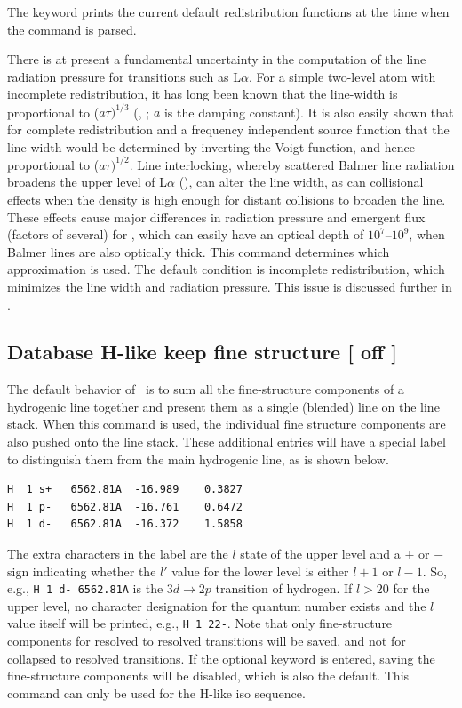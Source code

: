 The keyword  prints the current default
redistribution functions at the time when the command is parsed.

There is at present a fundamental uncertainty in the computation of the
line radiation pressure for transitions such as L$\alpha $.
For a simple two-level
atom with incomplete redistribution, it has long been known that the
line-width is proportional to ($a\tau)^{1/3}$
(\citealp{Adams1972}, \citealp{Harrington1973}; $a$ is
the damping constant).  It is also easily shown that for complete
redistribution and a frequency independent source function that the line
width would be determined by inverting the Voigt function, and hence
proportional to ($a\tau)^{1/2}$.
Line interlocking, whereby scattered Balmer line
radiation broadens the upper level of L$\alpha$
(\citealp{Hubbard1985}), can
alter the line width, as can collisional effects when the density is high
enough for distant collisions to broaden the line.
These effects cause
major differences in radiation pressure and emergent flux (factors of
several) for \la, which can easily have an optical depth of
$10^7$--$10^9$, when
Balmer lines are also optically thick.  
This command determines which
approximation is used.
The default condition is incomplete redistribution,
which minimizes the line width and radiation pressure.  This issue is
discussed further in \citet{Elitzur1986}.

\subsection{Database H-like keep fine structure [ off ]}

The default behavior of \Cloudy\ is to sum all the fine-structure components
of a hydrogenic line together and present them as a single (blended) line on
the line stack. When this command is used, the individual fine structure
components are also pushed onto the line stack. These additional entries will
have a special label to distinguish them from the main hydrogenic line, as is
shown below.

\begin{verbatim}
H  1 s+   6562.81A  -16.989    0.3827
H  1 p-   6562.81A  -16.761    0.6472
H  1 d-   6562.81A  -16.372    1.5858
\end{verbatim}

The extra characters in the label are the $l$ state of the upper level and a
$+$ or $-$ sign indicating whether the $l'$ value for the lower level is
either $l+1$ or $l-1$. So, e.g., \verb=H 1 d- 6562.81A= is the $3d \rightarrow
2p$ transition of hydrogen. If $l > 20$ for the upper level, no character
designation for the quantum number exists and the $l$ value itself will be
printed, e.g., \verb=H 1 22-=. Note that only fine-structure components for
resolved to resolved transitions will be saved, and not for collapsed to
resolved transitions. If the optional keyword  is entered,
saving the fine-structure components will be disabled, which is also the
default. This command can only be used for the H-like iso sequence.


